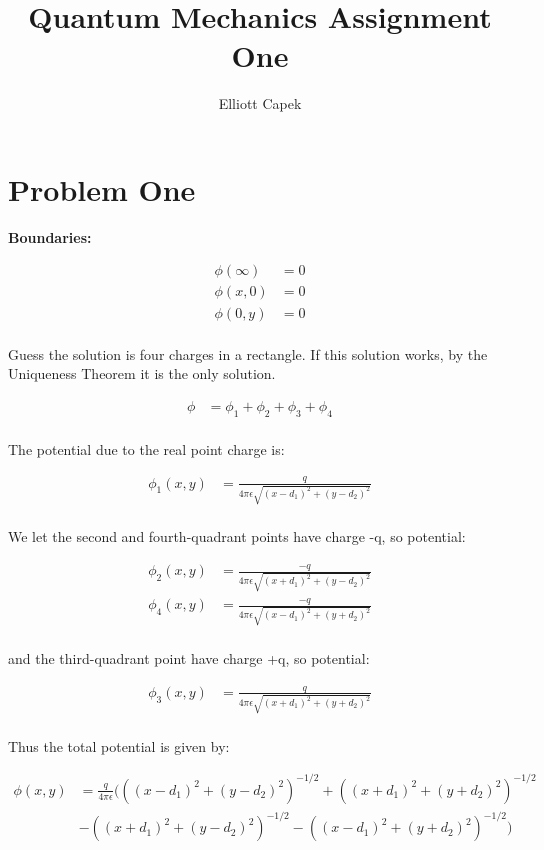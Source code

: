 \documentclass[10pt]{article} %
\title{Quantum Mechanics Assignment One}
\author{Elliott Capek}
\begin{document}
\maketitle{}

\section{Problem One}
\textbf{Boundaries:}

\begin{align*}
  \phi(\infty) &= 0\\
  \phi(x,0) &= 0\\
  \phi(0,y) &= 0\\
\end{align*}

Guess the solution is four charges in a rectangle. If this solution works, by the Uniqueness Theorem it is the only solution.

\begin{align*}
  \phi &= \phi_1 + \phi_2 + \phi_3 + \phi_4\\
\end{align*}

The potential due to the real point charge is:

\begin{align*}
  \phi_1(x,y) &= \frac{q}{4\pi\epsilon\sqrt{(x-d_1)^2+(y-d_2)^2}}\\
\end{align*}

We let the second and fourth-quadrant points have charge -q, so potential:

\begin{align*}
  \phi_2(x,y) &= \frac{-q}{4\pi\epsilon\sqrt{(x+d_1)^2+(y-d_2)^2}}\\
  \phi_4(x,y) &= \frac{-q}{4\pi\epsilon\sqrt{(x-d_1)^2+(y+d_2)^2}}\\
\end{align*}

and the third-quadrant point have charge +q, so potential:

\begin{align*}
  \phi_3(x,y) &= \frac{q}{4\pi\epsilon\sqrt{(x+d_1)^2+(y+d_2)^2}}\\
\end{align*}

Thus the total potential is given by:

\begin{align*}
  \phi(x,y) &= \frac{q}{4\pi\epsilon}\Big(
  \left((x-d_1)^2+(y-d_2)^2\right)^{-1/2} + \left((x+d_1)^2+(y+d_2)^2\right)^{-1/2}\\
  &-\left((x+d_1)^2+(y-d_2)^2\right)^{-1/2} - \left((x-d_1)^2+(y+d_2)^2\right)^{-1/2}\Big)
\end{align*}
\end{document}
